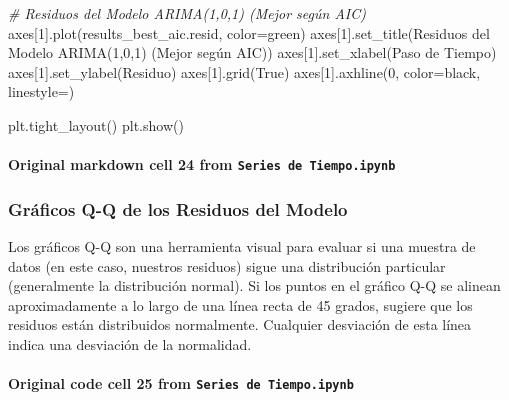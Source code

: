\documentclass[
  11pt,
]{article}
\newenvironment{Shaded}{}{}
\newcommand{\CommentTok}[1]{\textcolor[rgb]{0.38,0.63,0.69}{\textit{#1}}}
\newcommand{\DecValTok}[1]{\textcolor[rgb]{0.25,0.63,0.44}{#1}}
\newcommand{\NormalTok}[1]{#1}
\newcommand{\OperatorTok}[1]{\textcolor[rgb]{0.40,0.40,0.40}{#1}}
\newcommand{\StringTok}[1]{\textcolor[rgb]{0.25,0.44,0.63}{#1}}
\newcommand{\VariableTok}[1]{\textcolor[rgb]{0.10,0.09,0.49}{#1}}
\begin{document}
\begin{Shaded}
\begin{Highlighting}[]
\CommentTok{\# Residuos del Modelo ARIMA(1,0,1) (Mejor según AIC)}
\NormalTok{axes[}\DecValTok{1}\NormalTok{].plot(results\_best\_aic.resid, color}\OperatorTok{=}\StringTok{\textquotesingle{}green\textquotesingle{}}\NormalTok{)}
\NormalTok{axes[}\DecValTok{1}\NormalTok{].set\_title(}\StringTok{\textquotesingle{}Residuos del Modelo ARIMA(1,0,1) (Mejor según AIC)\textquotesingle{}}\NormalTok{)}
\NormalTok{axes[}\DecValTok{1}\NormalTok{].set\_xlabel(}\StringTok{\textquotesingle{}Paso de Tiempo\textquotesingle{}}\NormalTok{)}
\NormalTok{axes[}\DecValTok{1}\NormalTok{].set\_ylabel(}\StringTok{\textquotesingle{}Residuo\textquotesingle{}}\NormalTok{)}
\NormalTok{axes[}\DecValTok{1}\NormalTok{].grid(}\VariableTok{True}\NormalTok{)}
\NormalTok{axes[}\DecValTok{1}\NormalTok{].axhline(}\DecValTok{0}\NormalTok{, color}\OperatorTok{=}\StringTok{\textquotesingle{}black\textquotesingle{}}\NormalTok{, linestyle}\OperatorTok{=}\StringTok{\textquotesingle{}{-}{-}\textquotesingle{}}\NormalTok{)}

\NormalTok{plt.tight\_layout()}
\NormalTok{plt.show()}
\end{Highlighting}
\end{Shaded}

\paragraph{\texorpdfstring{Original markdown cell 24 from \texttt{Series\ de\ Tiempo.ipynb}}{Original markdown cell 24 from Series de Tiempo.ipynb}}\label{original-markdown-cell-24-from-series-de-tiempoipynb}

\subsubsection{Gráficos Q-Q de los Residuos del Modelo}\label{gruxe1ficos-q-q-de-los-residuos-del-modelo}

Los gráficos Q-Q son una herramienta visual para evaluar si una muestra de datos (en este caso, nuestros residuos) sigue una distribución particular (generalmente la distribución normal). Si los puntos en el gráfico Q-Q se alinean aproximadamente a lo largo de una línea recta de 45 grados, sugiere que los residuos están distribuidos normalmente. Cualquier desviación de esta línea indica una desviación de la normalidad.

\paragraph{\texorpdfstring{Original code cell 25 from \texttt{Series\ de\ Tiempo.ipynb}}{Original code cell 25 from Series de Tiempo.ipynb}}\label{original-code-cell-25-from-series-de-tiempoipynb}
\end{document}
